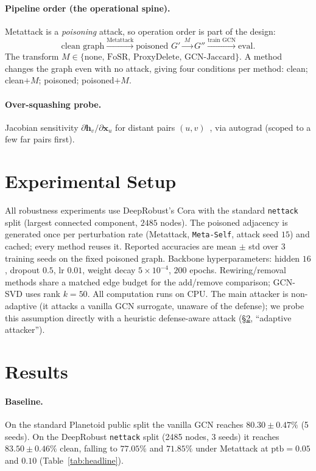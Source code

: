 \documentclass[10pt]{article}
\begin{document}
\paragraph{Pipeline order (the operational spine).} Metattack is a \emph{poisoning} attack, so operation
order is part of the design:
\[
\text{clean graph} \xrightarrow{\text{Metattack}} \text{poisoned } G'
\xrightarrow{\;M\;} G'' \xrightarrow{\text{train GCN}} \text{eval}.
\]
The transform $M \in \{\text{none, FoSR, ProxyDelete, GCN-Jaccard}\}$. A method changes the graph even with
no attack, giving four conditions per method: clean; clean${+}M$; poisoned; poisoned${+}M$.

\paragraph{Over-squashing probe.} Jacobian sensitivity $\partial \mathbf{h}_v / \partial \mathbf{x}_u$ for
distant pairs $(u,v)$~\citep{digiovanni2023oversquashing}, via autograd (scoped to a few far pairs first).

\section{Experimental Setup}
All robustness experiments use DeepRobust's Cora with the standard \texttt{nettack} split (largest connected
component, $2485$ nodes). The poisoned adjacency is generated once per perturbation rate (Metattack,
\texttt{Meta-Self}, attack seed $15$) and cached; every method reuses it. Reported accuracies are mean $\pm$
std over $3$ training seeds on the fixed poisoned graph. Backbone hyperparameters: hidden $16$, dropout
$0.5$, lr $0.01$, weight decay $5\!\times\!10^{-4}$, $200$ epochs. Rewiring/removal methods share a matched
edge budget for the add/remove comparison; GCN-SVD uses rank $k{=}50$. All computation runs on CPU.
The main attacker is non-adaptive (it attacks a vanilla GCN surrogate, unaware of the defense); we probe
this assumption directly with a heuristic defense-aware attack (\S\ref{sec:results}, ``adaptive attacker'').

\section{Results}\label{sec:results}
\paragraph{Baseline.} On the standard Planetoid public split the vanilla GCN reaches $80.30 \pm 0.47\%$
(5 seeds). On the DeepRobust \texttt{nettack} split (2485 nodes, 3 seeds) it reaches $83.50 \pm 0.46\%$
clean, falling to $77.05\%$ and $71.85\%$ under Metattack at $\text{ptb}=0.05$ and $0.10$
(Table~\ref{tab:headline}).
\end{document}
